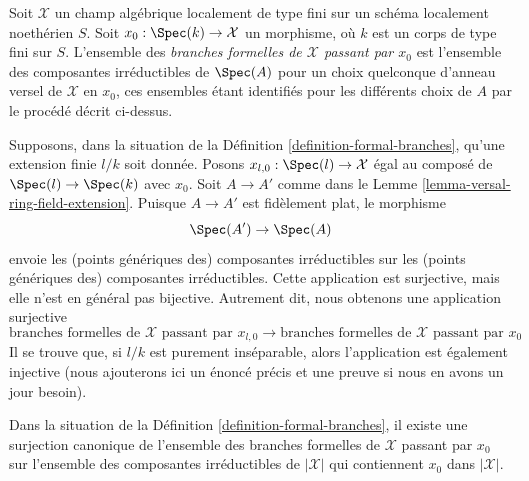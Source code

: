 \begin{definition}
\label{definition-formal-branches}
Soit $\mathcal{X}$ un champ algébrique localement de type fini
sur un schéma localement noethérien $S$. Soit $x_0 : \Spec(k) \to \mathcal{X}$
un morphisme, où $k$ est un corps de type fini sur $S$.
L'ensemble des {\it branches formelles de $\mathcal{X}$ passant par $x_0$}
est l'ensemble des composantes irréductibles de $\Spec(A)$
pour un choix quelconque d'anneau versel de $\mathcal{X}$ en $x_0$,
ces ensembles étant identifiés pour les différents choix de $A$ par le procédé décrit ci-dessus.
\end{definition}

\noindent
Supposons, dans la situation de la Définition \ref{definition-formal-branches},
qu'une extension finie $l/k$ soit donnée. Posons
$x_{l, 0} : \Spec(l) \to \mathcal{X}$ égal au composé de
$\Spec(l) \to \Spec(k)$ avec $x_0$. Soit
$A \to A'$ comme dans le Lemme \ref{lemma-versal-ring-field-extension}.
Puisque $A \to A'$ est fidèlement plat, le morphisme
$$
\Spec(A') \to \Spec(A)
$$
envoie les (points génériques des) composantes irréductibles sur les
(points génériques des) composantes irréductibles.
Cette application est surjective, mais
elle n'est en général pas bijective.
Autrement dit, nous obtenons une application surjective
$$
\text{branches formelles de }\mathcal{X}\text{ passant par }x_{l, 0}
\longrightarrow
\text{branches formelles de }\mathcal{X}\text{ passant par }x_0
$$
Il se trouve que, si $l/k$ est purement inséparable, alors
l'application est également injective (nous ajouterons ici un énoncé précis
et une preuve si nous en avons un jour besoin).

\begin{lemma}
\label{lemma-branches}
Dans la situation de la Définition \ref{definition-formal-branches},
il existe une surjection canonique de l'ensemble des branches formelles de
$\mathcal{X}$ passant par $x_0$ sur l'ensemble des composantes irréductibles de
$|\mathcal{X}|$ qui contiennent $x_0$ dans $|\mathcal{X}|$.
\end{lemma}

